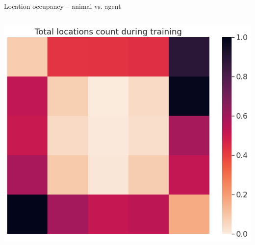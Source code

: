 \documentclass[bigger]{beamer}
\begin{document}
\begin{frame}[label={sec:org6f7572e}]{Location occupancy -- animal vs. agent}
\begin{columns}
\begin{column}{0.5\columnwidth}
\begin{center}
\end{center}
\begin{center}
\includegraphics[height=0.4\textheight]{img/func_approx_ego_locations_count_all_steps_all_cues.png}
\end{center}
\end{column}
\end{columns}
\end{frame}
\end{document}
